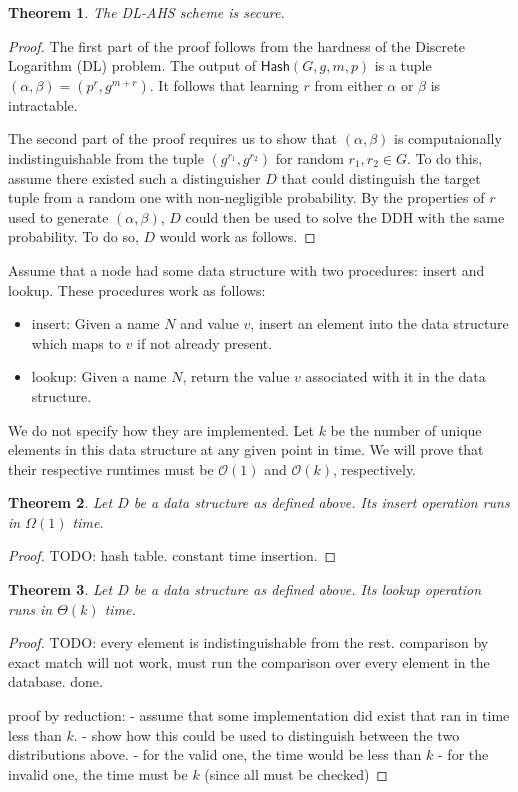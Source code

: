 \documentclass{article}
\newtheorem{thm}{Theorem}
\begin{document}
\begin{thm}
The DL-AHS scheme is secure.
\end{thm}
\begin{proof}
The first part of the proof follows from the hardness of the Discrete Logarithm (DL) problem. The
output of $\mathsf{Hash}(G, g, m, p)$ is a tuple $(\alpha, \beta) = (p^r, g^{m + r})$. It follows
that learning $r$ from either $\alpha$ or $\beta$ is intractable.

The second part of the proof requires us to show that $(\alpha, \beta)$ is computaionally
indistinguishable from the tuple $(g^{r_1}, g^{r_2})$ for random $r_1, r_2 \in G$.
To do this, assume there existed such a distinguisher $D$ that could distinguish
the target tuple from a random one with non-negligible probability. By the
properties of $r$ used to generate $(\alpha, \beta)$, $D$ could then be used to
solve the DDH with the same probability. To do so, $D$ would work as follows.

\end{proof}


Assume that a node had some data structure with two procedures: {\sf insert} and {\sf lookup}.
These procedures work as follows:
%
\begin{itemize}
    \item {\sf insert}: Given a name $N$ and value $v$, insert an element into the data structure which maps to $v$ if not already present.
    \item {\sf lookup}: Given a name $N$, return the value $v$ associated with it in the data structure.
\end{itemize}
%

We do not specify how they are implemented. Let $k$ be the number of unique elements in this
data structure at any given point in time. We will prove that their respective runtimes must
be $\mathcal{O}(1)$ and $\mathcal{O}(k)$, respectively.

\begin{thm}
Let $D$ be a data structure as defined above. Its {\sf insert} operation runs in $\Omega(1)$ time.
\end{thm}
\begin{proof}
TODO: hash table. constant time insertion.
\end{proof}

\begin{thm}
Let $D$ be a data structure as defined above. Its {\sf lookup} operation runs in $\Theta(k)$ time.
\end{thm}
\begin{proof}
TODO: every element is indistinguishable from the rest. comparison by exact match will not work, must run
the comparison over every element in the database. done.

proof by reduction:
- assume that some implementation did exist that ran in time less than $k$.
- show how this could be used to distinguish between the two distributions above.
    - for the valid one, the time would be less than $k$
    - for the invalid one, the time must be $k$ (since all must be checked)
\end{proof}
\end{document}
